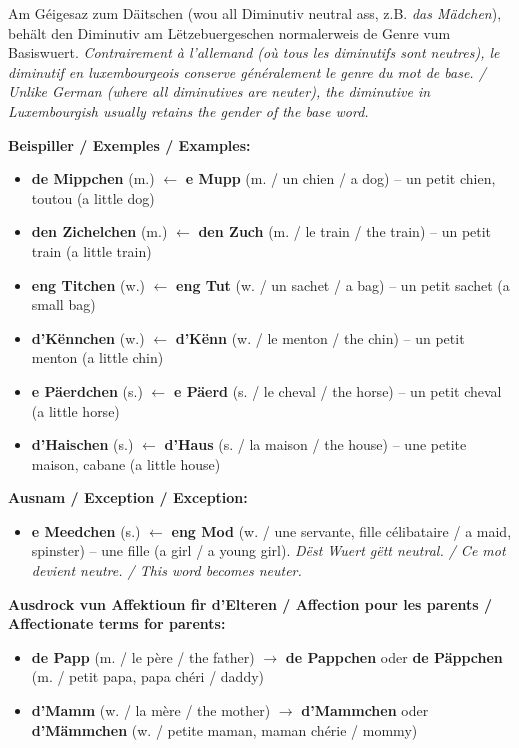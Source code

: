 Am Géigesaz zum Däitschen (wou all Diminutiv neutral ass, z.B. \textit{das Mädchen}), behält den Diminutiv am Lëtzebuergeschen normalerweis de Genre vum Basiswuert. \textit{Contrairement à l'allemand (où tous les diminutifs sont neutres), le diminutif en luxembourgeois conserve généralement le genre du mot de base. / Unlike German (where all diminutives are neuter), the diminutive in Luxembourgish usually retains the gender of the base word.}

\vspace{0.5em}
\textbf{Beispiller / Exemples / Examples:}
\begin{itemize}
    \item \textbf{de Mippchen} (m.) $\leftarrow$ \textbf{e Mupp} (m. / un chien / a dog) -- un petit chien, toutou (a little dog)
    \item \textbf{den Zichelchen} (m.) $\leftarrow$ \textbf{den Zuch} (m. / le train / the train) -- un petit train (a little train)
    \item \textbf{eng Titchen} (w.) $\leftarrow$ \textbf{eng Tut} (w. / un sachet / a bag) -- un petit sachet (a small bag)
    \item \textbf{d'Kënnchen} (w.) $\leftarrow$ \textbf{d'Kënn} (w. / le menton / the chin) -- un petit menton (a little chin)
    \item \textbf{e Päerdchen} (s.) $\leftarrow$ \textbf{e Päerd} (s. / le cheval / the horse) -- un petit cheval (a little horse)
    \item \textbf{d'Haischen} (s.) $\leftarrow$ \textbf{d'Haus} (s. / la maison / the house) -- une petite maison, cabane (a little house)
\end{itemize}

\textbf{Ausnam / Exception / Exception:}
\begin{itemize}
    \item \textbf{e Meedchen} (s.) $\leftarrow$ \textbf{eng Mod} (w. / une servante, fille célibataire / a maid, spinster) -- une fille (a girl / a young girl). \textit{Dëst Wuert gëtt neutral. / Ce mot devient neutre. / This word becomes neuter.}
\end{itemize}

\textbf{Ausdrock vun Affektioun fir d'Elteren / Affection pour les parents / Affectionate terms for parents:}
\begin{itemize}
    \item \textbf{de Papp} (m. / le père / the father) $\rightarrow$ \textbf{de Pappchen} oder \textbf{de Päppchen} (m. / petit papa, papa chéri / daddy)
    \item \textbf{d'Mamm} (w. / la mère / the mother) $\rightarrow$ \textbf{d'Mammchen} oder \textbf{d'Mämmchen} (w. / petite maman, maman chérie / mommy)
\end{itemize}

